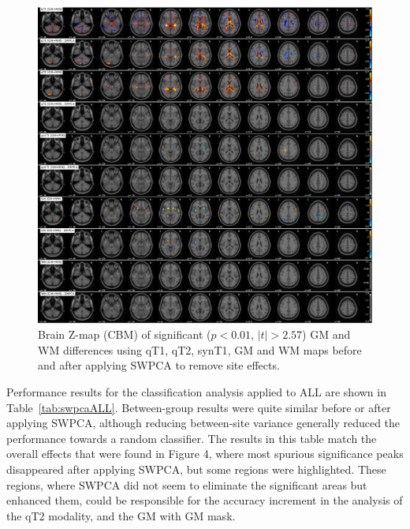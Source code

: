 \begin{figure}
	\centering
	\includegraphics[width=\linewidth]{Graphics/ch7/FIGURE05}
	\caption[Brain Z-map (\acs{CBM}) of significant ($p<0.01$, $|t|>2.57$) \acs{GM} and \acs{WM} differences using \acs{qT1}, \acs{qT2}, \acs{synT1}, \acs{GM} and \acs{WM} maps before and after applying \acs{SWPCA} to remove site effects.]{Brain Z-map (\ac{CBM}) of significant ($p<0.01$, $|t|>2.57$) \acs{GM} and \acs{WM} differences using \ac{qT1}, \ac{qT2}, \ac{synT1}, \ac{GM} and \ac{WM} maps before and after applying \ac{SWPCA} to remove site effects.}
	\label{fig:swpcaFIGURE05}
\end{figure}

Performance results for the classification analysis applied to ALL are
shown in Table~\ref{tab:swpcaALL}. Between-group results were quite similar before or
after applying \ac{SWPCA}, although reducing between-site variance generally
reduced the performance towards a random classifier. The results in
this table match the overall effects that were found in Figure 4, where
most spurious significance peaks disappeared after applying \ac{SWPCA}, but
some regions were highlighted. These regions, where \ac{SWPCA} did not seem
to eliminate the significant areas but enhanced them, could be
responsible for the accuracy increment in the analysis of the \ac{qT2}
modality, and the \ac{GM} with GM mask.

